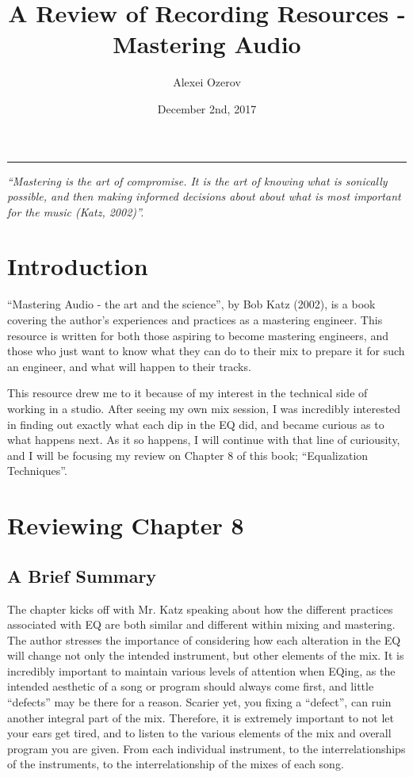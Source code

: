 \documentclass{article}
\author{Alexei Ozerov}
\title{A Review of Recording Resources - Mastering Audio}
\date{December 2nd, 2017}
\begin{document}
\maketitle
\tableofcontents
\begin{center}
\noindent\rule{12cm}{0.4pt}
\textit{``Mastering is the art of compromise. It is the art of knowing what is sonically possible, and then making informed decisions about about what is most important for the music (Katz, 2002)''.}
\end{center}

\vspace{0.6cm}

\section{Introduction}

``Mastering Audio - the art and the science'', by Bob Katz (2002), is a book covering the author's experiences and practices as a mastering engineer. This resource is written for both those aspiring to become mastering engineers, and those who just want to know what they can do to their mix to prepare it for such an engineer, and what will happen to their tracks.

\medskip

This resource drew me to it because of my interest in the technical side of working in a studio. After seeing my own mix session, I was incredibly interested in finding out exactly what each dip in the EQ did, and became curious as to what happens next.
As it so happens, I will continue with that line of curiousity, and I will be focusing my review on Chapter 8 of this book; ``Equalization Techniques''. 

\pagebreak

\section{Reviewing Chapter 8}

\subsection{A Brief Summary}

The chapter kicks off with Mr. Katz speaking about how the different practices associated with EQ are both similar and different within mixing and mastering. The author stresses the importance of considering how each alteration in the EQ will change not only the intended instrument, but other elements of the mix.
It is incredibly important to maintain various levels of attention when EQing, as the intended aesthetic of a song or program should always come first, and little ``defects'' may be there for a reason. Scarier yet, you fixing a ``defect'', can ruin another integral part of the mix. Therefore, it is extremely important to not let your ears get tired, and to listen to the various elements of the mix and overall program you are given. From each individual instrument, to the interrelationships of the instruments, to the interrelationship of the mixes of each song.
\end{document}
